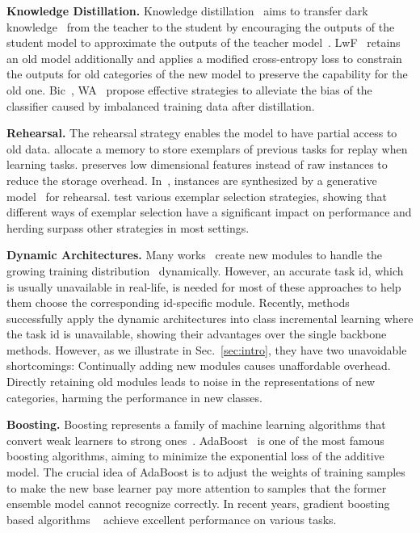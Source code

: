 \documentclass[runningheads]{llncs}
\begin{document}
\noindent\textbf{Knowledge Distillation.}
Knowledge distillation~\cite{KD} aims to transfer dark knowledge~\cite{korattikara2015bayesian} from the teacher to the student by encouraging the outputs of the student model to approximate the outputs of the teacher model~\cite{LWF}.  LwF~\cite{LWF} retains an old model additionally and applies a modified cross-entropy loss to constrain the outputs for old categories of the new model to preserve the capability for the old one. Bic~\cite{bic}, WA~\cite{WA} propose effective strategies to alleviate the bias of the classifier caused by imbalanced training data after distillation.

\noindent\textbf{Rehearsal.}
The rehearsal strategy enables the model to have partial access to old data. \cite{icarl,bic,WA,wang2021memory} allocate a memory to store exemplars of previous tasks for replay when learning tasks. \cite{iscen2020memory} preserves low dimensional features instead of raw instances to reduce the storage overhead. In~\cite{wu2021incremental}, instances are synthesized by a generative model~\cite{GANs} for rehearsal. \cite{CILsurvey} test various exemplar selection strategies, showing that different ways of exemplar selection have a significant impact on performance and herding surpass other strategies in most settings. 

\noindent\textbf{Dynamic Architectures.}
Many works~\cite{fernando2017pathnet,golkar2019continual,hung2019compacting,rusu2016progressive,wen2020batchensemble} create new modules to handle the growing training distribution~\cite{yoon2017lifelong,lesort2019generative} dynamically. However, an accurate task id, which is usually unavailable in real-life, is needed for most of these approaches to help them choose the corresponding id-specific module. Recently, methods~\cite{der,simpleder,dytox} successfully apply the dynamic architectures into class incremental learning where the task id is unavailable, showing their advantages over the single backbone methods.  However, as we illustrate in Sec.~\ref{sec:intro}, they have two unavoidable shortcomings:  Continually adding new modules causes unaffordable overhead.  Directly retaining old modules leads to noise in the representations of new categories, harming the performance in new classes. 

\noindent\textbf{Boosting.}
Boosting represents a family of machine learning algorithms that convert weak learners to strong ones~\cite{zhou2012ensemble}. AdaBoost~\cite{friedman2000additive} is one of the most famous boosting algorithms, aiming to minimize the exponential loss of the additive model. The crucial idea of AdaBoost is to adjust the weights of training samples to make the new base learner pay more attention to samples that the former ensemble model cannot recognize correctly. In recent years, gradient boosting~\cite{friedman2001greedy} based algorithms ~\cite{chen2016xgboost,ke2017lightgbm,dorogush2018catboost} achieve excellent performance on various tasks.
\end{document}
